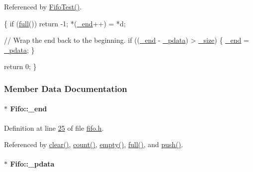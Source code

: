 Referenced by \hyperlink{fifo_8cpp_source_l00110}{FifoTest()}.


\begin{DoxyCode}
\{
    \textcolor{keywordflow}{if} (\hyperlink{class_fifo_a2b09a5751fc2a301a341245e98f1e44a}{full}()) \textcolor{keywordflow}{return} -1;
    *(\hyperlink{class_fifo_a5dea8e3ee360dd0555d25f1a57938a8f}{_end}++) = *d;
    
    \textcolor{comment}{// Wrap the end back to the beginning.}
    \textcolor{keywordflow}{if} ((\hyperlink{class_fifo_a5dea8e3ee360dd0555d25f1a57938a8f}{_end} - \hyperlink{class_fifo_adb3c9f91291d0af42197c7b30a718506}{_pdata}) > \hyperlink{class_fifo_a0eb7824d54929e385223ef2e32c45c91}{_size}) \{
        \hyperlink{class_fifo_a5dea8e3ee360dd0555d25f1a57938a8f}{_end} = \hyperlink{class_fifo_adb3c9f91291d0af42197c7b30a718506}{_pdata};
    \}

        \textcolor{keywordflow}{return} 0;
\}
\end{DoxyCode}


\subsubsection{Member Data Documentation}
\hypertarget{class_fifo_a5dea8e3ee360dd0555d25f1a57938a8f}{
\paragraph[{\_\-end}]{$\ast$ {\bf Fifo::\_\-end}}\hfill}
\label{class_fifo_a5dea8e3ee360dd0555d25f1a57938a8f}


Definition at line \hyperlink{fifo_8h_source_l00025}{25} of file \hyperlink{fifo_8h_source}{fifo.h}.



Referenced by \hyperlink{fifo_8cpp_source_l00022}{clear()}, \hyperlink{fifo_8cpp_source_l00050}{count()}, \hyperlink{fifo_8cpp_source_l00066}{empty()}, \hyperlink{fifo_8cpp_source_l00060}{full()}, and \hyperlink{fifo_8cpp_source_l00074}{push()}.

\hypertarget{class_fifo_adb3c9f91291d0af42197c7b30a718506}{
\paragraph[{\_\-pdata}]{$\ast$ {\bf Fifo::\_\-pdata}}\hfill}
\label{class_fifo_adb3c9f91291d0af42197c7b30a718506}


